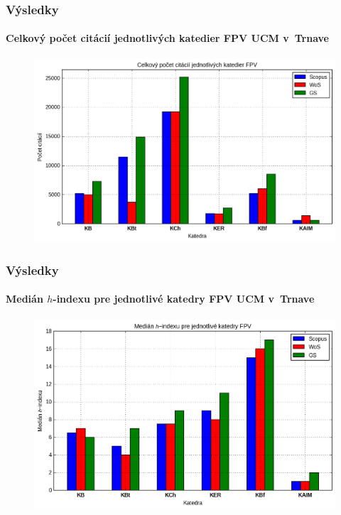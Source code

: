 \documentclass{beamer}
\begin{document}
\begin{frame}
  \frametitle{Výsledky}
  \framesubtitle{Celkový počet citácií jednotlivých katedier FPV UCM v~Trnave}
  \begin{figure}
    \centering
    \includegraphics[scale=0.5]{plot-results-data-citations.png}
  \end{figure}
\end{frame}

\begin{frame}
  \frametitle{Výsledky}
  \framesubtitle{Medián $h$-indexu pre jednotlivé katedry FPV UCM v~Trnave}
  \begin{figure}
    \centering
    \includegraphics[scale=0.5]{plot-results-data-h_index.png}
  \end{figure}
\end{frame}
\end{document}
